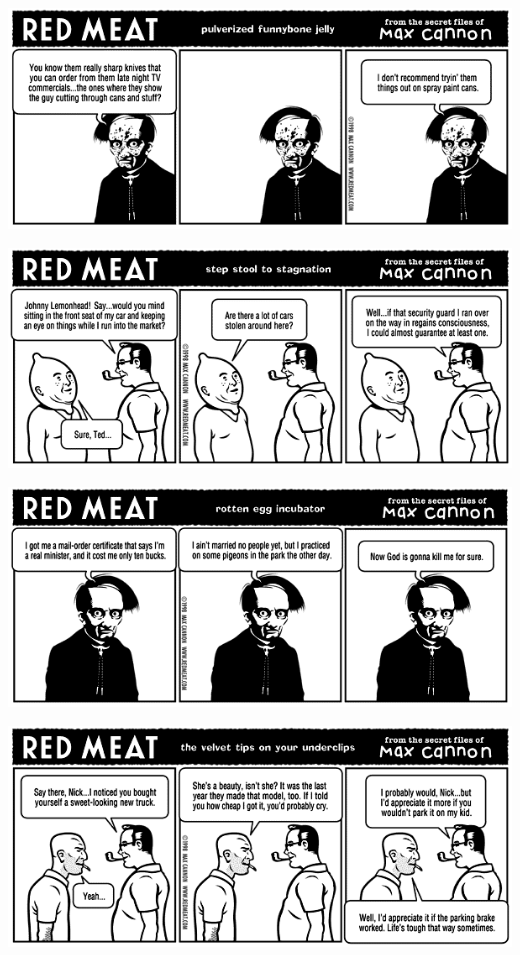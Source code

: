 \documentclass[a4paper,twoside,11pt]{article}
\begin{document}
\includegraphics[width=\textwidth]{redmeat_1998-08-31.png}



\includegraphics[width=\textwidth]{redmeat_1998-09-07.png}



\includegraphics[width=\textwidth]{redmeat_1998-09-14.png}



\includegraphics[width=\textwidth]{redmeat_1998-09-21.png}
\end{document}
